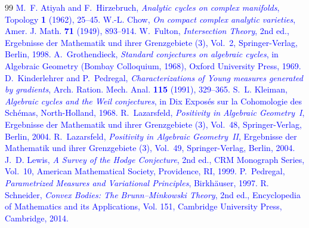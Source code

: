 \documentclass[11pt]{article}
\newcommand{\REV}[1]{\textcolor{blue}{#1}}
\numberwithin{equation}{section}  %
\theoremstyle{plain}
\theoremstyle{definition}
\theoremstyle{remark}
\begin{document}
\begin{thebibliography}{99}
\REV{M.~F. Atiyah and F.~Hirzebruch,
\emph{Analytic cycles on complex manifolds},
Topology \textbf{1} (1962), 25--45.}
\REV{W.-L. Chow,
\emph{On compact complex analytic varieties},
Amer. J. Math. \textbf{71} (1949), 893--914.}
\REV{W.~Fulton,
\emph{Intersection Theory},
2nd ed., Ergebnisse der Mathematik und ihrer Grenzgebiete (3), Vol.~2, Springer-Verlag, Berlin, 1998.}
\REV{A.~Grothendieck,
\emph{Standard conjectures on algebraic cycles},
in Algebraic Geometry (Bombay Colloquium, 1968), Oxford University Press, 1969.}
\REV{D.~Kinderlehrer and P.~Pedregal,
\emph{Characterizations of Young measures generated by gradients},
Arch. Ration. Mech. Anal. \textbf{115} (1991), 329--365.}
\REV{S.~L. Kleiman,
\emph{Algebraic cycles and the Weil conjectures},
in Dix Expos\'es sur la Cohomologie des Sch\'emas, North-Holland, 1968.}
\REV{R.~Lazarsfeld,
\emph{Positivity in Algebraic Geometry~I},
Ergebnisse der Mathematik und ihrer Grenzgebiete (3), Vol.~48, Springer-Verlag, Berlin, 2004.}
\REV{R.~Lazarsfeld,
\emph{Positivity in Algebraic Geometry~II},
Ergebnisse der Mathematik und ihrer Grenzgebiete (3), Vol.~49, Springer-Verlag, Berlin, 2004.}
\REV{J.~D. Lewis,
\emph{A Survey of the Hodge Conjecture},
2nd ed., CRM Monograph Series, Vol.~10, American Mathematical Society, Providence, RI, 1999.}
\REV{P.~Pedregal,
\emph{Parametrized Measures and Variational Principles},
Birkh\"auser, 1997.}
\REV{R. Schneider,
\emph{Convex Bodies: The Brunn--Minkowski Theory},
2nd ed., Encyclopedia of Mathematics and its Applications, Vol. 151, Cambridge University Press, Cambridge, 2014.}
\end{thebibliography}



\end{document}
